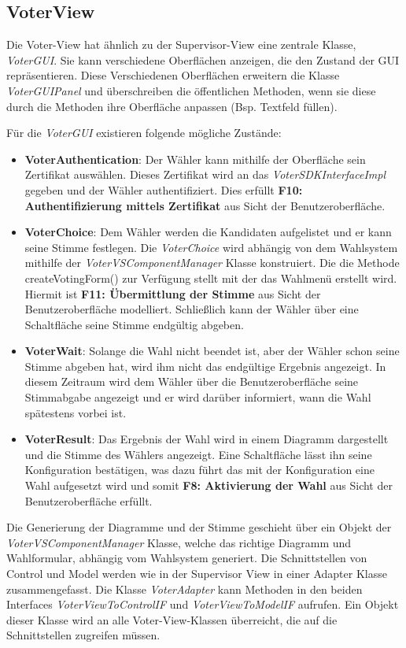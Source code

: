 \documentclass[parskip=full]{scrartcl}
\newcommand{\textitx}[1]{\mbox{\textit{#1}}}
\newcommand{\fakeparagraph}[1]{\textbf{#1}}
\begin{document}
		\subsection{VoterView}
		Die Voter-View hat ähnlich zu der Supervisor-View eine zentrale Klasse, \textitx{VoterGUI}. Sie kann verschiedene Oberflächen anzeigen, die den Zustand der GUI repräsentieren. Diese Verschiedenen Oberflächen erweitern die Klasse \textitx{VoterGUIPanel} und überschreiben die öffentlichen Methoden, wenn sie diese durch die Methoden ihre Oberfläche anpassen (Bsp. Textfeld füllen).
		
		Für die \textitx{VoterGUI} existieren folgende mögliche Zustände:
		\begin{itemize}
			\item\fakeparagraph{VoterAuthentication}: Der Wähler kann mithilfe der Oberfläche sein Zertifikat auswählen. Dieses Zertifikat wird an das \textit{VoterSDKInterfaceImpl} gegeben und der Wähler authentifiziert. Dies erfüllt \textbf{F10: Authentifizierung mittels Zertifikat} aus Sicht der Benutzeroberfläche.
			\item\fakeparagraph{VoterChoice}: Dem Wähler werden die Kandidaten aufgelistet und er kann seine Stimme festlegen. Die \textitx{VoterChoice} wird abhängig von dem Wahlsystem mithilfe der \textit{VoterVSComponentManager} Klasse konstruiert. Die die Methode createVotingForm() zur Verfügung stellt mit der das Wahlmenü erstellt wird. Hiermit ist \textbf{F11: Übermittlung der Stimme} aus Sicht der Benutzeroberfläche modelliert. Schließlich kann der Wähler über eine Schaltfläche seine Stimme endgültig abgeben. 
			\item\fakeparagraph{VoterWait}: Solange die Wahl nicht beendet ist, aber der Wähler schon seine Stimme abgeben hat, wird ihm nicht das endgültige Ergebnis angezeigt. In diesem Zeitraum wird dem Wähler über die Benutzeroberfläche seine Stimmabgabe angezeigt und er wird darüber informiert, wann die Wahl spätestens vorbei ist.
			\item\fakeparagraph{VoterResult}: Das Ergebnis der Wahl wird in einem Diagramm dargestellt und die Stimme des Wählers angezeigt. Eine Schaltfläche lässt ihn seine Konfiguration bestätigen, was dazu führt das mit der Konfiguration eine Wahl aufgesetzt wird und somit \textbf{F8: Aktivierung der Wahl} aus Sicht der Benutzeroberfläche erfüllt.
		\end{itemize}
	
		Die Generierung der Diagramme und der Stimme geschieht über ein Objekt der \textit{VoterVSComponentManager} Klasse, welche das richtige Diagramm und Wahlformular, abhängig vom Wahlsystem generiert.		
		Die Schnittstellen von Control und Model werden wie in der Supervisor View in einer Adapter Klasse zusammengefasst. Die Klasse \textitx{VoterAdapter} kann Methoden in den beiden Interfaces \textit{VoterViewToControlIF} und \textit{VoterViewToModelIF} aufrufen. Ein Objekt dieser Klasse wird an alle Voter-View-Klassen überreicht, die auf die Schnittstellen zugreifen müssen.
		
\end{document}
